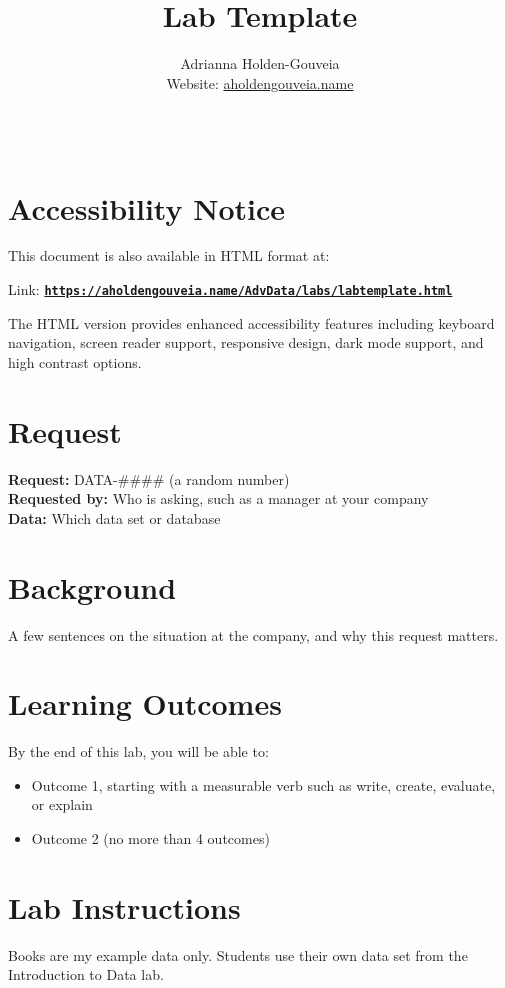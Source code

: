 \documentclass[12pt]{article}
\title{Lab Template}
\author{
        Adrianna Holden-Gouveia \\
        Website: \href{https://aholdengouveia.name}{aholdengouveia.name}\\ 
        \date{\vspace{-5ex}}
        \faGithub {: aholdengouveia} \\
        }
\begin{document}
    

\maketitle



\section*{Accessibility Notice}
This document is also available in HTML format at:

Link: \href{https://aholdengouveia.name/AdvData/labs/labtemplate.html}{\textbf{\nolinkurl{https://aholdengouveia.name/AdvData/labs/labtemplate.html}}}

The HTML version provides enhanced accessibility features including keyboard navigation, screen reader support, responsive design, dark mode support, and high contrast options.

\section*{Request}
\noindent\textbf{Request:} DATA-\#\#\#\# (a random number)\\
\textbf{Requested by:} Who is asking, such as a manager at your company\\
\textbf{Data:} Which data set or database

\section*{Background}
A few sentences on the situation at the company, and why this request matters.

\section*{Learning Outcomes}
By the end of this lab, you will be able to:
\begin{itemize}
    \item Outcome 1, starting with a measurable verb such as write, create, evaluate, or explain
    \item Outcome 2 (no more than 4 outcomes)
\end{itemize}
\section*{Lab Instructions}
Books are my example data only. Students use their own data set from the Introduction to Data lab.
\end{document}
